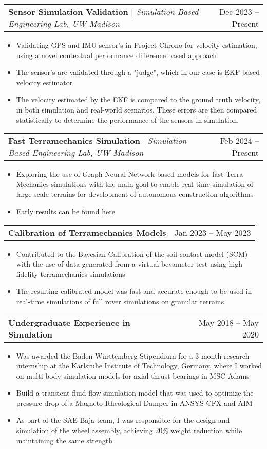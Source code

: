 \documentclass[letterpaper,11pt]{article}
\makeatletter
\newcommand{\resumeItem}[1]{
  \item\small{
    {#1 \vspace{-2pt}}
  }
}
\newcommand{\resumeProjectHeading}[2]{
    \item
    \begin{tabular*}{0.97\textwidth}{l@{\extracolsep{\fill}}r}
      \small#1 & #2 \\
    \end{tabular*}\vspace{-7pt}
}
\newcommand{\resumeItemListStart}{\begin{itemize}}
\newcommand{\resumeItemListEnd}{\end{itemize}\vspace{-5pt}}
\makeatother
\begin{document}
      \resumeProjectHeading
        {\textbf{Sensor Simulation Validation} $|$ \footnotesize\emph{Simulation Based Engineering Lab, UW Madison}}{Dec 2023 -- Present}
        \resumeItemListStart
            \resumeItem{Validating GPS and IMU sensor's in Project Chrono for velocity estimation, using a novel contextual performance difference based approach}
            \resumeItem{The sensor's are validated through a "judge", which in our case is EKF based velocity estimator}
            \resumeItem{The velocity estimated by the EKF is compared to the ground truth velocity, in both simulation and real-world scenarios. These errors are then compared statistically to determine the performance of the sensors in simulation.}
        \resumeItemListEnd

        \resumeProjectHeading
        {\textbf{Fast Terramechanics Simulation} $|$ \footnotesize\emph{Simulation Based Engineering Lab, UW Madison}}{Feb 2024 -- Present}
        \resumeItemListStart
            \resumeItem{Exploring the use of Graph-Neural Network based models for fast Terra Mechanics simulations with the main goal to enable real-time simulation of large-scale terrains for development of autonomous construction algorithms}
            \resumeItem{Early results can be found \href{https://uwmadison.box.com/s/pef8eecph7l4agdf3eyslu618wc8aivz}{here}}
        \resumeItemListEnd

        \resumeProjectHeading
        {\textbf{Calibration of Terramechanics Models}}{Jan 2023 -- May 2023}
        \resumeItemListStart
            \resumeItem{Contributed to the Bayesian Calibration of the soil contact model (SCM) with the use of data generated from a virtual bevameter test using high-fidelity terramechanics simulations}
            \resumeItem{The resulting calibrated model was fast and accurate enough to be used in real-time simulations of full rover simulations on granular terrains}

        \resumeItemListEnd

        \resumeProjectHeading
        {\textbf{Undergraduate Experience in Simulation}}{May 2018 -- May 2020}
        \resumeItemListStart
            \resumeItem{Was awarded the Baden-Württemberg Stipendium for a 3-month research internship at the Karlsruhe Institute of Technology, Germany, where I worked on multi-body simulation models for axial thrust bearings in MSC Adams}
            \resumeItem{Build a transient fluid flow simulation model that was used to optimize the pressure drop of a Magneto-Rheological Damper in ANSYS CFX and AIM}
            \resumeItem{As part of the SAE Baja team, I was responsible for the design and simulation of the wheel assembly, achieving 20\% weight reduction while maintaining the same strength}
        \resumeItemListEnd
\end{document}

